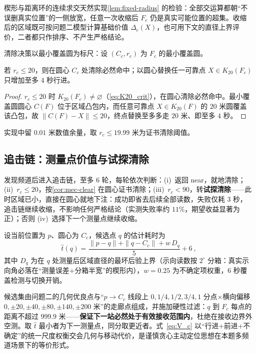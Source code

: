 \documentclass[withoutpreface]{cumcmthesis}
\begin{document}
楔形与距离环的连续求交天然实现\cref{lem:fixed-radius} 的检验：全部交运算都朝“不误删真实位置”的一侧放宽，任意一次收缩后 $F_c$ 仍是真实可能位置的超集。收缩后的区域既可按问题二模型计算基础价值 $\Delta_c(X)$，也可用下文的直径上界评价，二者都只作排序、不产生严格结论。

清除决策以最小覆盖圆为标尺：设 $(C_c,r_c)$ 为 $F_c$ 的最小覆盖圆。

\begin{corollary}[圆心清除]\label{cor:mec-clear}
若 $r_c\le20$，则在圆心 $C_c$ 处清除必然命中；以圆心替换任一可靠点 $X\in K_{20}(F_c)$ 只增加至多 $4$ 秒行进。
\end{corollary}
\begin{proof}
$r_c\le20$ 时 $K_{20}(F_c)\ne\varnothing$（\cref{eq:K20_crit}），在圆心清除必然命中。最小覆盖圆圆心 $C(F)$ 位于区域凸包内，而任意可靠点 $X\in K_{20}(F)$ 的 $20$ 米圆覆盖该凸包，故 $\|C(F)-X\|\le20$，终点替换至多多走 $20$ 米、即至多 $4$ 秒。
\end{proof}

实现中留 $0.01$ 米数值余量，取 $r_c\le19.99$ 米为证书清除阈值。

\subsection{追击链：测量点价值与试探清除}

发现频道后进入追击链，至多 $6$ 轮，每轮依次判断：(i)~返回 near，就地清除；(ii)~$r_c\le20$，按\cref{cor:mec-clear} 在圆心证书清除；(iii)~$r_c<90$，转\textbf{试探清除}——此时区域已小，直接在圆心就地下注：成功即省去后续全部读数，失败仅耗 $3$ 秒，追击链继续收缩，不影响任何严格结论（实测失败率约 $11\%$，期望收益显著为正）；否则 (iv)~选择下一个测量点继续收缩。

设当前位置为 $p$、圆心为 $C_c$，候选点 $q$ 的估计耗时为
\begin{equation}\label{eq:V_c}
\boxed{\ \hat t(q)=\frac{\|p-q\|+\|q-C_c\|+w\,D_q}{5}+6\ },
\end{equation}
其中 $D_q$ 为在 $q$ 处测量后区域直径的最坏后验上界（示向读数按 $2^\circ$ 分箱：真实示向角必落在“测量误差$+$分箱半宽”的楔形内），$w=0.25$ 为不确定项权重，$6$ 秒覆盖检测与切换开销。

候选集由问题二的几何优良点与“$p\to C_c$ 线段上 $0,1/4,1/2,3/4,1$ 分点$\times$横向偏移 $0,\pm20,\pm40,\pm80,\pm140,\pm200$ 米”的走廊点组成，并施加硬性过滤：$q$ 到 $F_c$ 每点的距离不超过 $999.9$ 米——\textbf{保证下一站必然处于有效接收范围内}，杜绝在接收边界外空测。取 $\hat t$ 最小者为下一测量点，同分取更近者。式~\eqref{eq:V_c} 以“行进$+$前进$+$不确定”的统一尺度权衡交会几何与移动代价，是谨慎贪心主动定位思想在本题多频道场景下的等价形式。
\end{document}
